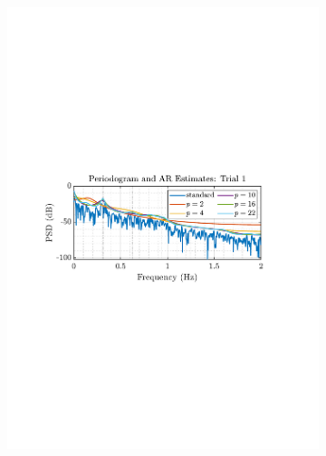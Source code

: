 \documentclass[12pt]{article}
\begin{document}
		\begin{figure}[H]
			\begin{subfigure}{0.49\textwidth}
				\includegraphics[trim={2.2cm 11.2cm 3.15cm  11.2cm}, clip, width=\textwidth]{../MATLAB/figures/q1_5c_fig01.pdf} 
			\end{subfigure}
			\begin{subfigure}{0.49\textwidth}

\end{subfigure}
\end{figure}
\end{document}
